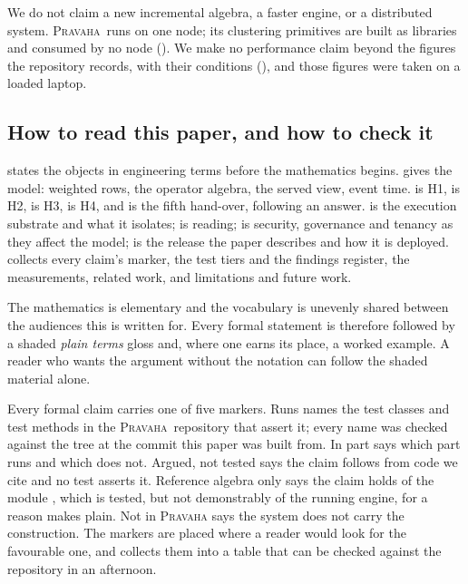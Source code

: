 \documentclass[11pt,a4paper]{article}
\renewcommand{\_}{\oldunderscore\allowbreak}
\newcommand{\Pv}{\textsc{Pravaha}}
\newcommand{\code}[1]{\texttt{\pvbreakable{#1}}}
\begin{document}
We do not claim a new incremental algebra, a faster engine, or a distributed system. \Pv\ runs on one
node; its clustering primitives are built as libraries and consumed by no node ().
We make no performance claim beyond the figures the repository records, with their conditions
(), and those figures were taken on a loaded laptop.

\subsection{How to read this paper, and how to check it}

 states the objects in engineering terms before the mathematics begins.
 gives the model: weighted rows, the operator algebra, the served view, event time.
 is H1,  is H2,  is H3,
 is H4, and  is the fifth hand-over, following an answer.
 is the execution substrate and what it isolates;  is reading;
 is security, governance and tenancy as they affect the model;  is
the release the paper describes and how it is deployed.  collects every claim's
marker,  the test tiers and the findings register,  the
measurements,  related work, and  limitations and future work.

The mathematics is elementary and the vocabulary is unevenly shared between the audiences this is
written for. Every formal statement is therefore followed by a shaded \emph{plain terms} gloss and,
where one earns its place, a worked example. A reader who wants the argument without the notation can
follow the shaded material alone.

Every formal claim carries one of five markers. \textsf{Runs} names the test classes and test
methods in the \Pv\ repository that assert it; every name was checked against the tree at the commit
this paper was built from. \textsf{In part} says which part runs and which does not.
\textsf{Argued, not tested} says the claim follows from code we cite and no test asserts it.
\textsf{Reference algebra only} says the claim holds of the module \code{pravaha-algebra}, which is
tested, but not demonstrably of the running engine, for a reason  makes
plain. \textsf{Not in \Pv} says the system does not carry the construction. The markers are placed
where a reader would look for the favourable one, and  collects them into a table
that can be checked against the repository in an afternoon.
\end{document}
